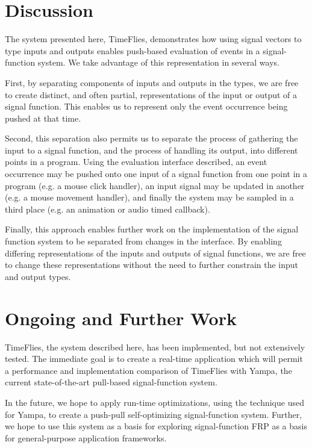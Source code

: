 \section{Discussion}
\label{section:Discussion}

The system presented here, TimeFlies, demonstrates how using signal vectors
to type inputs and outputs enables push-based evaluation of events in a
signal-function system. We take advantage of this representation in several ways.

First, by separating components of inputs and outputs in the types, we are free
to create distinct, and often partial, representations of the input or output
of a signal function. This enables us to represent only the event occurrence
being pushed at that time.

Second, this separation also permits us to separate the process of gathering
the input to a signal function, and the process of handling its output, into
different points in a program. Using the evaluation interface described, an
event occurrence may be pushed onto one input of a signal function from one
point in a program (e.g. a mouse click handler), an input signal
may be updated in another (e.g. a mouse movement handler), and finally the
system may be sampled in a third place (e.g. an animation or audio timed
callback).

Finally, this approach enables further work on the implementation of the signal
function system to be separated from changes in the interface. By enabling
differing representations of the inputs and outputs of signal functions, we are
free to change these representations without the need to further constrain the
input and output types.

\section{Ongoing and Further Work}
\label{section:Ongoing_and_Further_Work}

TimeFlies, the system described here, has been implemented, but not
extensively tested. The immediate goal is to create a real-time application
which will permit a performance and implementation comparison of TimeFlies with
Yampa, the current state-of-the-art pull-based signal-function system.

In the future, we hope to apply run-time optimizations, using the technique used
for Yampa, to create a push-pull self-optimizing signal-function system. Further,
we hope to use this system as a basis for exploring signal-function FRP as a
basis for general-purpose application frameworks.
